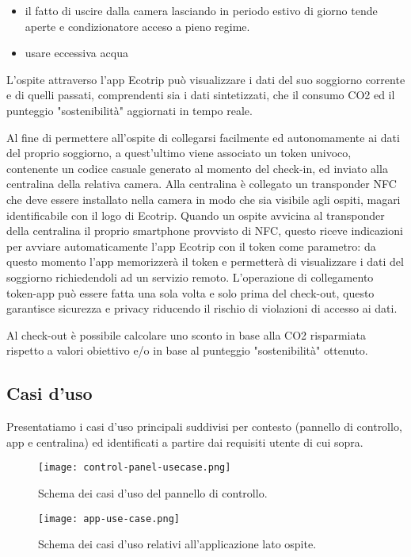 \begin{itemize}
    \item il fatto di uscire dalla camera lasciando in periodo estivo di giorno tende aperte e condizionatore acceso a pieno regime.
    \item usare eccessiva acqua
\end{itemize}

L'ospite attraverso l'app Ecotrip può visualizzare i dati del suo soggiorno
corrente e di quelli passati, comprendenti sia i dati sintetizzati, che il
consumo CO2 ed il punteggio "sostenibilità" aggiornati in tempo reale.

Al fine di permettere all'ospite di collegarsi facilmente ed autonomamente ai
dati del proprio soggiorno, a quest'ultimo viene associato un token univoco,
contenente un codice casuale generato al momento del check-in, ed inviato alla
centralina della relativa camera. Alla centralina è collegato un transponder NFC
che deve essere installato nella camera in modo che sia visibile agli ospiti,
magari identificabile con il logo di Ecotrip. Quando un ospite avvicina al
transponder della centralina il proprio smartphone provvisto di NFC, questo
riceve indicazioni per avviare automaticamente l'app Ecotrip con il token come
parametro: da questo momento l'app memorizzerà il token e permetterà di
visualizzare i dati del soggiorno richiedendoli ad un servizio remoto.
L'operazione di collegamento token-app può essere fatta una sola volta e solo
prima del check-out, questo garantisce sicurezza e privacy riducendo il rischio
di violazioni di accesso ai dati.

Al check-out è possibile calcolare uno sconto in base alla CO2 risparmiata
rispetto a valori obiettivo e/o in base al punteggio "sostenibilità" ottenuto.

\subsection{Casi d'uso}
Presentatiamo i casi d'uso principali suddivisi per contesto (pannello di controllo, app e centralina) ed 
identificati a partire dai requisiti utente di cui sopra. 

\begin{figure}[H]
    \texttt{[image: control-panel-usecase.png]}
    \centering
    \caption[control-panel-usecase]{Schema dei casi d'uso del pannello di controllo.}
    \label{fig:cp-usecase}
\end{figure}

\begin{figure}[H]
    \texttt{[image: app-use-case.png]}
    \centering
    \caption[app-usecase]{Schema dei casi d'uso relativi all'applicazione lato ospite.}
    \label{fig:app-usecase}
\end{figure}

